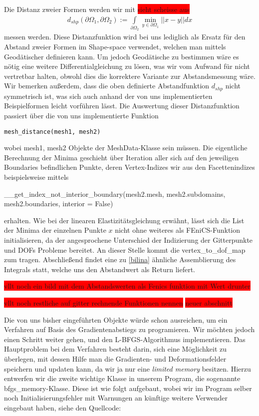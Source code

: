Die Distanz zweier Formen werden wir mit 
\colorbox{red}{sieht scheisse aus}
\begin{align}\label{distfktdef}
	d_{shp}(\partial\Omega_1, \partial\Omega_2) := \underset{\partial\Omega_2}{\int} \underset{y\in\partial\Omega_1}{\min} \vert\vert x - y \vert\vert dx
\end{align}
messen werden. Diese Distanzfunktion wird bei uns lediglich als Ersatz für den Abstand zweier Formen im Shape-space verwendet, welchen man mittels Geodätischer definieren kann. Um jedoch Geodätische zu bestimmen wäre es nötig eine weitere Differentialgleichung zu lösen, was wir vom Aufwand für nicht vertretbar halten, obwohl dies die korrektere Variante zur Abstandsmessung wäre. Wir bemerken außerdem, dass die oben definierte Abstandfunktion $d_{shp}$ nicht symmetrisch ist, was sich auch anhand der von uns implementierten Beispielformen leicht vorführen lässt. Die Auswertung dieser Distanzfunktion passiert über die von uns implementierte Funktion
\begin{lstlisting}
mesh_distance(mesh1, mesh2)
\end{lstlisting}
wobei \textsf{mesh1, mesh2} Objekte der \textsf{MeshData}-Klasse sein müssen. Die eigentliche Berechnung der Minima geschieht über Iteration aller sich auf den jeweiligen Boundaries befindlichen Punkte, deren Vertex-Indizes wir aus den Facettenindizes beispielsweise mittels     
\begin{center}
\textsf{\_\_get\_index\_not\_interior\_boundary(mesh2.mesh, mesh2.subdomains, mesh2.boundaries, interior = False)}
\end{center}
erhalten. Wie bei der linearen Elastizitätsgleichung erwähnt, lässt sich die List der Minima der einzelnen Punkte $x$ nicht ohne weiteres als FEniCS-Funktion initialisieren, da der angesprochene Unterschied der Indizierung der Gitterpunkte und DOFs Probleme bereitet. An dieser Stelle kommt die vertex\_to\_dof\_map zum tragen. Abschließend findet eine zu \ref{bilina} ähnliche Assemblierung des Integrals statt, welche uns den Abstandwert als Return liefert. 

\colorbox{red}{vllt noch ein bild mit dem Abstandswerten als Fenics funktion mit Wert drunter}

\colorbox{red}{vllt noch restliche auf gitter rechnende Funktionen nennen}
\colorbox{red}{neuer abschnitt}

Die von uns bisher eingeführten Objekte würde schon ausreichen, um ein Verfahren auf Basis des Gradientenabstiegs zu programieren. Wir möchten jedoch einen Schritt weiter gehen, und den L-BFGS-Algorithmus implementieren. Das Hauptproblem bei dem Verfahren besteht darin, sich eine Möglichkeit zu überlegen, mit dessen Hilfe man die Gradienten- und Deformationsfelder speichern und updaten kann, da wir ja nur eine \textit{limited memory} besitzen. Hierzu entwerfen wir die zweite wichtige Klasse in unserem Program, die sogenannte \textsf{bfgs\_memory}-Klasse. Diese ist wie folgt aufgebaut, wobei wir im Program selber noch Initialisierungsfehler mit Warnungen an künftige weitere Verwender eingebaut haben, siehe den Quellcode:

